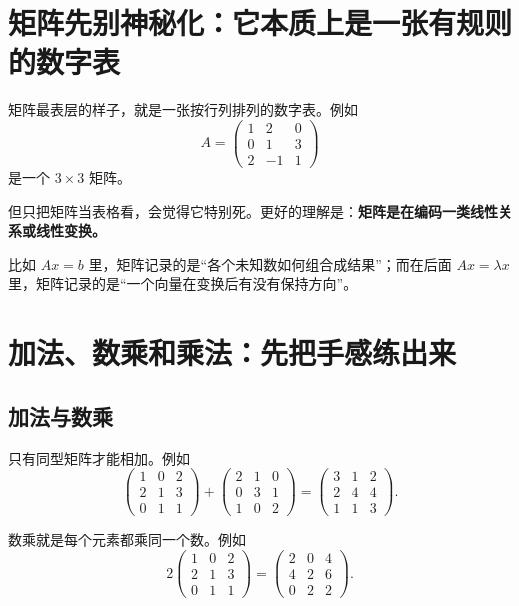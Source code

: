\documentclass[11pt,oneside,UTF8]{ctexbook}
\newcommand{\important}[1]{\textcolor{Sakura}{\textbf{#1}}}
\begin{document}
\section{矩阵先别神秘化：它本质上是一张有规则的数字表}

矩阵最表层的样子，就是一张按行列排列的数字表。例如
\[
A=
\begin{pmatrix}
1&2&0\\
0&1&3\\
2&-1&1
\end{pmatrix}
\]
是一个 \(3\times 3\) 矩阵。

但只把矩阵当表格看，会觉得它特别死。更好的理解是：\important{矩阵是在编码一类线性关系或线性变换。}

比如 \(Ax=b\) 里，矩阵记录的是“各个未知数如何组合成结果”；而在后面 \(Ax=\lambda x\) 里，矩阵记录的是“一个向量在变换后有没有保持方向”。

\section{加法、数乘和乘法：先把手感练出来}

\subsection{加法与数乘}

只有同型矩阵才能相加。例如
\[
\begin{pmatrix}
1&0&2\\
2&1&3\\
0&1&1
\end{pmatrix}
+
\begin{pmatrix}
2&1&0\\
0&3&1\\
1&0&2
\end{pmatrix}
=
\begin{pmatrix}
3&1&2\\
2&4&4\\
1&1&3
\end{pmatrix}.
\]

数乘就是每个元素都乘同一个数。例如
\[
2
\begin{pmatrix}
1&0&2\\
2&1&3\\
0&1&1
\end{pmatrix}
=
\begin{pmatrix}
2&0&4\\
4&2&6\\
0&2&2
\end{pmatrix}.
\]
\end{document}
